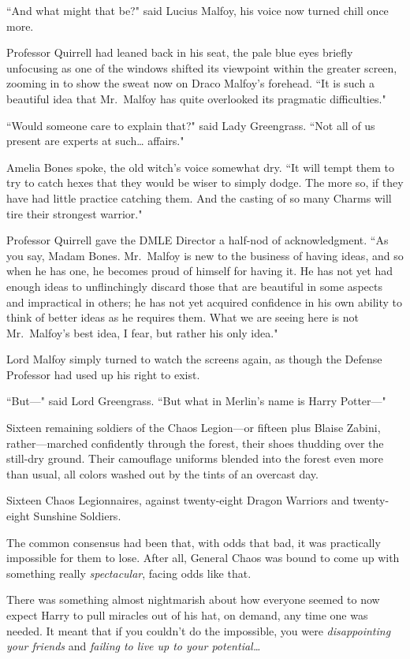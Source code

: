 ``And what might that be?" said Lucius Malfoy, his voice now turned chill once more.

Professor Quirrell had leaned back in his seat, the pale blue eyes briefly unfocusing as one of the windows shifted its viewpoint within the greater screen, zooming in to show the sweat now on Draco Malfoy's forehead. ``It is such a beautiful idea that Mr.~Malfoy has quite overlooked its pragmatic difficulties."

``Would someone care to explain that?" said Lady Greengrass. ``Not all of us present are experts at such{\ldots} affairs."

Amelia Bones spoke, the old witch's voice somewhat dry. ``It will tempt them to try to catch hexes that they would be wiser to simply dodge. The more so, if they have had little practice catching them. And the casting of so many Charms will tire their strongest warrior."

Professor Quirrell gave the DMLE Director a half-nod of acknowledgment. ``As you say, Madam Bones. Mr.~Malfoy is new to the business of having ideas, and so when he has one, he becomes proud of himself for having it. He has not yet had enough ideas to unflinchingly discard those that are beautiful in some aspects and impractical in others; he has not yet acquired confidence in his own ability to think of better ideas as he requires them. What we are seeing here is not Mr.~Malfoy's best idea, I fear, but rather his only idea."

Lord Malfoy simply turned to watch the screens again, as though the Defense Professor had used up his right to exist.

``But—" said Lord Greengrass. ``But what in Merlin's name is Harry Potter—"

\later

Sixteen remaining soldiers of the Chaos Legion—or fifteen plus Blaise Zabini, rather—marched confidently through the forest, their shoes thudding over the still-dry ground. Their camouflage uniforms blended into the forest even more than usual, all colors washed out by the tints of an overcast day.

Sixteen Chaos Legionnaires, against twenty-eight Dragon Warriors and twenty-eight Sunshine Soldiers.

The common consensus had been that, with odds that bad, it was practically impossible for them to lose. After all, General Chaos was bound to come up with something really \emph{spectacular}, facing odds like that.

There was something almost nightmarish about how everyone seemed to now expect Harry to pull miracles out of his hat, on demand, any time one was needed. It meant that if you couldn't do the impossible, you were \emph{disappointing your friends} and \emph{failing to live up to your potential{\ldots}}

